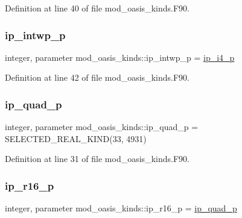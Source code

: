 Definition at line 40 of file mod\+\_\+oasis\+\_\+kinds.\+F90.

\mbox{\label{namespacemod__oasis__kinds_a7bf99d9ca4dbcaa5e6207e48835d2ca2}} 
\subsubsection{\texorpdfstring{ip\+\_\+intwp\+\_\+p}{ip\_intwp\_p}}
{\footnotesize\ttfamily integer, parameter mod\+\_\+oasis\+\_\+kinds\+::ip\+\_\+intwp\+\_\+p = \hyperlink{namespacemod__oasis__kinds_a1e3c90ad6857ff8675d3e2548d516200}{ip\+\_\+i4\+\_\+p}}



Definition at line 42 of file mod\+\_\+oasis\+\_\+kinds.\+F90.

\mbox{\label{namespacemod__oasis__kinds_a7889b0425dd055cdc74af6ba9fa1354c}} 
\subsubsection{\texorpdfstring{ip\+\_\+quad\+\_\+p}{ip\_quad\_p}}
{\footnotesize\ttfamily integer, parameter mod\+\_\+oasis\+\_\+kinds\+::ip\+\_\+quad\+\_\+p = S\+E\+L\+E\+C\+T\+E\+D\+\_\+\+R\+E\+A\+L\+\_\+\+K\+I\+ND(33, 4931)}



Definition at line 31 of file mod\+\_\+oasis\+\_\+kinds.\+F90.

\mbox{\label{namespacemod__oasis__kinds_a865ff1d43dba43a1ff14004e28d51542}} 
\subsubsection{\texorpdfstring{ip\+\_\+r16\+\_\+p}{ip\_r16\_p}}
{\footnotesize\ttfamily integer, parameter mod\+\_\+oasis\+\_\+kinds\+::ip\+\_\+r16\+\_\+p = \hyperlink{namespacemod__oasis__kinds_a7889b0425dd055cdc74af6ba9fa1354c}{ip\+\_\+quad\+\_\+p}}



